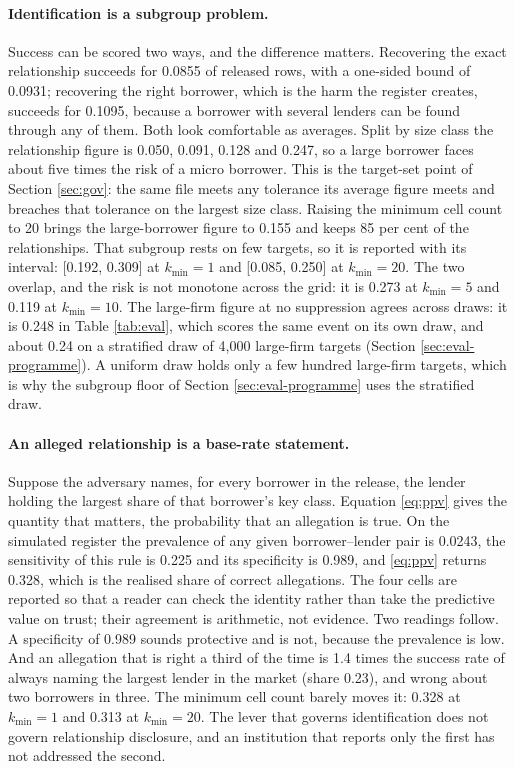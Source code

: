 \documentclass[11pt,a4paper]{article}
\theoremstyle{plain}
\theoremstyle{definition}
\theoremstyle{definition}
\theoremstyle{plain}
\begin{document}


\paragraph{Identification is a subgroup problem.} Success can be scored two ways,
and the difference matters. Recovering the exact relationship succeeds for 0.0855
of released rows, with a one-sided bound of 0.0931; recovering the right borrower,
which is the harm the register creates, succeeds for 0.1095, because a borrower
with several lenders can be found through any of them. Both look comfortable as
averages. Split by size class the relationship figure is 0.050, 0.091, 0.128 and
0.247, so a large borrower faces about five times the risk of a micro borrower.
This is the target-set point of Section \ref{sec:gov}: the same file meets any
tolerance its average figure meets and breaches that tolerance on the largest
size class. Raising the minimum cell count to 20 brings the large-borrower
figure to 0.155 and keeps 85 per cent of the relationships. That subgroup rests
on few targets, so it is reported with its interval: [0.192, 0.309] at
$k_{\min} = 1$ and [0.085, 0.250] at $k_{\min} = 20$. The two overlap, and the
risk is not monotone across the grid: it is 0.273 at $k_{\min} = 5$ and 0.119 at
$k_{\min} = 10$. The large-firm figure at no suppression agrees across draws: it
is 0.248 in Table \ref{tab:eval}, which scores the same event on its own draw,
and about 0.24 on a stratified draw of 4{,}000 large-firm targets (Section
\ref{sec:eval-programme}). A uniform draw holds only a few hundred large-firm
targets, which is why the subgroup floor of Section \ref{sec:eval-programme} uses
the stratified draw.

\paragraph{An alleged relationship is a base-rate statement.} Suppose the
adversary names, for every borrower in the release, the lender holding the
largest share of that borrower's key class. Equation \eqref{eq:ppv} gives the
quantity that matters, the probability that an allegation is true. On the
simulated register the prevalence of any given borrower--lender pair is 0.0243,
the sensitivity of this rule is 0.225 and its specificity is 0.989, and
\eqref{eq:ppv} returns 0.328, which is the realised share of correct
allegations. The four cells are reported so that a reader can check the identity
rather than take the predictive value on trust; their agreement is arithmetic,
not evidence. Two readings follow. A specificity of 0.989 sounds protective and
is not, because the prevalence is low. And an allegation that is right a third
of the time is 1.4 times the success rate of always naming the largest lender in
the market (share 0.23), and wrong about two borrowers in three. The minimum cell
count barely moves it: 0.328 at $k_{\min} = 1$ and 0.313 at $k_{\min} = 20$. The
lever that governs identification does not govern relationship disclosure, and
an institution that reports only the first has not addressed the second.
\end{document}
